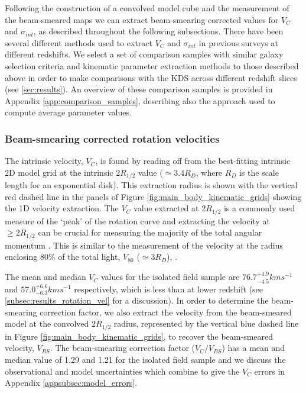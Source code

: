 \documentclass[fleqn,usenatbib]{mn2e}
\begin{document}
Following the construction of a convolved model cube and the measurement of the beam-smeared maps we can extract beam-smearing corrected values for $V_{C}$ and $\sigma_{int}$, as described throughout the following subsections.
There have been several different methods used to extract $V_{C}$ and $\sigma_{int}$ in previous surveys at different redshifts.
We select a set of comparison samples with similar galaxy selection criteria and kinematic parameter extraction methods to those described above in order to make comparisons with the KDS across different redshift slices (see \cref{sec:results}).
An overview of these comparison samples is provided in Appendix \ref{app:comparison_samples}, describing also the approach used to compute average parameter values.

\subsubsection{Beam-smearing corrected rotation velocities}\label{subsubsec:beam_smearing_corrected_velocities}
The intrinsic velocity, $V_{C}$, is found by reading off from the best-fitting intrinsic 2D model grid at the intrinsic $2R_{1/2}$ value ($\simeq3.4R_{D}$, where $R_{D}$ is the scale length for an exponential disk).
This extraction radius is shown with the vertical red dashed line in the panels of Figure \ref{fig:main_body_kinematic_grids} showing the 1D velocity extraction.
The $V_{C}$ value extracted at $2R_{1/2}$ is a commonly used measure of the `peak' of the rotation curve \citep[e.g.][]{Miller2011,Stott2016,Pelliccia2017,Harrison2017,Swinbank2017} and extracting the velocity at $\geqslant 2R_{1/2}$ can be crucial for measuring the majority of the total angular momentum \citep[e.g.][]{Obreschkow2015,Harrison2017,Swinbank2017}.
This is similar to the measurement of the velocity at the radius enclosing 80$\%$ of the total light, $V_{80}$ ($\simeq3R_{D}$), \citep{Tiley2016a}.

The mean and median $V_{C}$ values for the isolated field sample are $76.7^{+4.9}_{-4.5}kms^{-1}$ and $57.0^{+6.6}_{-6.3}kms^{-1}$ respectively, which is less than at lower redshift (see \cref{subsec:results_rotation_vel} for a discussion).
In order to determine the beam-smearing correction factor, we also extract the velocity from the beam-smeared model at the convolved $2R_{1/2}$ radius, represented by the vertical blue dashed line in Figure \ref{fig:main_body_kinematic_grids}, to recover the beam-smeared velocity, $V_{BS}$.
The beam-smearing correction factor ($V_{C}/V_{BS}$) has a mean and median value of 1.29 and 1.21 for the isolated field sample and we discuss the observational and model uncertainties which combine to give the $V_{C}$ errors in Appendix \ref{appsubsec:model_errors}. \\
\end{document}
